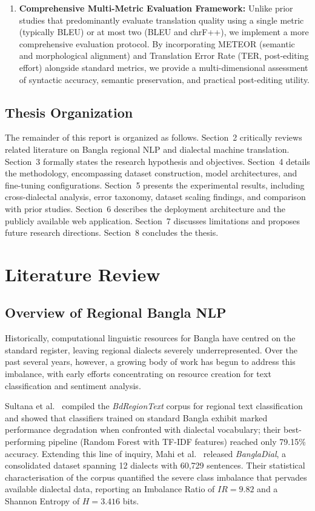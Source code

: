 \documentclass[12pt,a4paper]{article}
\begin{document}
\begin{enumerate}[leftmargin=*]
    \item \textbf{Comprehensive Multi-Metric Evaluation Framework:} Unlike prior studies that predominantly evaluate translation quality using a single metric (typically BLEU) or at most two (BLEU and chrF++), we implement a more comprehensive evaluation protocol. By incorporating METEOR (semantic and morphological alignment) and Translation Error Rate (TER, post-editing effort) alongside standard metrics, we provide a multi-dimensional assessment of syntactic accuracy, semantic preservation, and practical post-editing utility.
\end{enumerate}

\subsection{Thesis Organization}
The remainder of this report is organized as follows. Section~2 critically reviews related literature on Bangla regional NLP and dialectal machine translation. Section~3 formally states the research hypothesis and objectives. Section~4 details the methodology, encompassing dataset construction, model architectures, and fine-tuning configurations. Section~5 presents the experimental results, including cross-dialectal analysis, error taxonomy, dataset scaling findings, and comparison with prior studies. Section~6 describes the deployment architecture and the publicly available web application. Section~7 discusses limitations and proposes future research directions. Section~8 concludes the thesis.


\section{Literature Review}

\subsection{Overview of Regional Bangla NLP}
Historically, computational linguistic resources for Bangla have centred on the standard register, leaving regional dialects severely underrepresented. Over the past several years, however, a growing body of work has begun to address this imbalance, with early efforts concentrating on resource creation for text classification and sentiment analysis.

Sultana et al.~\cite{sultana2024bdregion} compiled the \textit{BdRegionText} corpus for regional text classification and showed that classifiers trained on standard Bangla exhibit marked performance degradation when confronted with dialectal vocabulary; their best-performing pipeline (Random Forest with TF-IDF features) reached only 79.15\% accuracy. Extending this line of inquiry, Mahi et al.~\cite{mahi2025bangladial} released \textit{BanglaDial}, a consolidated dataset spanning 12 dialects with 60,729 sentences. Their statistical characterisation of the corpus quantified the severe class imbalance that pervades available dialectal data, reporting an Imbalance Ratio of $IR = 9.82$ and a Shannon Entropy of $H = 3.416$ bits.
\end{document}
